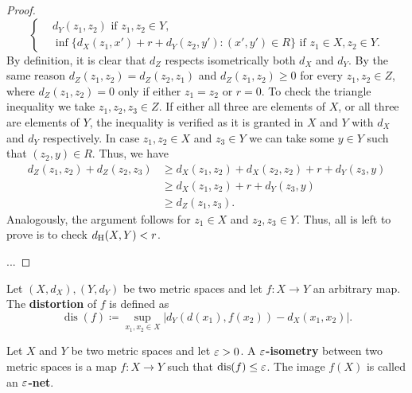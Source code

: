 \begin{proof}
\begin{equation}
\begin{cases}
            &d_Y(z_1, z_2) \text{ if } z_1, z_2 \in Y, \\
            &\inf\{d_X(z_1, x') + r + d_Y(z_2, y') \colon (x', y') \in R\} \text{ if } z_1 \in X, z_2 \in Y.
        \end{cases}
    \end{equation}
    By definition, it is clear that $ d_Z $ respects isometrically both $ d_X $ and $ d_Y $. By the same reason $ d_Z(z_1, z_2) = d_Z(z_2, z_1) $  and $ d_Z(z_1, z_2) \geq 0 $ for every $ z_1, z_2 \in Z$, where $ d_Z(z_1, z_2) = 0 $ only if either $ z_1 = z_2 $ or $ r = 0$. To check the triangle inequality we take $ z_1, z_2, z_3 \in Z $. If either all three are elements of $ X $, or all three are elements of $ Y $, the inequality is verified as it is granted in $ X $ and $ Y $ with $ d_X $ and $ d_Y $ respectively. In case $ z_1, z_2 \in X $ and $ z_3 \in Y $ we can take some $ y \in Y $ such that $ (z_2, y) \in R $. Thus, we have
    \begin{align}
        d_Z(z_1, z_2) + d_Z(z_2, z_3) &\geq d_X(z_1, z_2) + d_X(z_2, z_2) + r + d_Y(z_3, y) \\
        &\geq d_X(z_1, z_2) + r + d_Y(z_3, y) \\
        &\geq d_Z(z_1, z_3).
    \end{align}
    Analogously, the argument follows for $ z_1 \in X $ and $ z_2, z_3 \in Y $. Thus, all is left to prove is to check $ d_{\operatorname{H}}(X, Y) < r $.

    ...
\end{proof}

\begin{definition}
    Let $ (X, d_X), (Y, d_Y) $ be two metric spaces and let $ f \colon X \to Y $ an arbitrary map. The {\bf distortion} of $ f $ is defined as
    \begin{equation}
        \operatorname{dis}(f) \coloneq \sup_{x_1, x_2 \in X} |d_Y(d(x_1), f(x_2)) - d_X(x_1, x_2)|.
    \end{equation}
\end{definition}

\begin{definition}[$\e$-isometry]
    Let $ X $ and $ Y $ be two metric spaces and let $ \varepsilon > 0 $. A {\bf $\e$-isometry} between two metric spaces is a map $ f \colon X \to Y $ such that $ \operatorname{dis}(f) \leq \varepsilon $. The image $ f(X) $ is called an {\bf $\e$-net}.
\end{definition}

